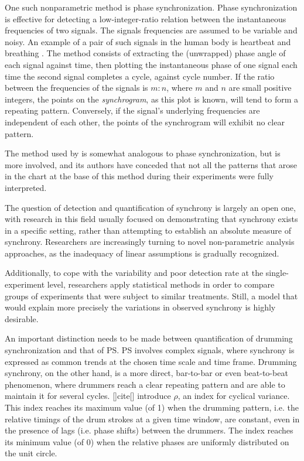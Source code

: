 \documentclass[a4paper, 11pt]{report}      %
\begin{document}
One such nonparametric method is phase synchronization. Phase synchronization is effective for detecting a low-integer-ratio relation between the instantaneous frequencies of two signals. The signals frequencies are assumed to be variable and noisy. An example of a pair of such signals in the human body is heartbeat and breathing \citep{schafer1998heartbeat}. The method consists of extracting the (unwrapped) phase angle of each signal against time, then plotting the instantaneous phase of one signal each time the second signal completes a cycle, against cycle number. If the ratio between the frequencies of the signals is $m:n$, where $m$ and $n$ are small positive integers, the points on the \emph{synchrogram}, as this plot is known, will tend to form a repeating pattern. Conversely, if the signal's underlying frequencies are independent of each other, the points of the synchrogram will exhibit no clear pattern.

The method used by \cite{wallot2016multidimensional} is somewhat analogous to phase synchronization, but is more involved, and its authors have conceded that not all the patterns that arose in the chart at the base of this method during their experiments were fully interpreted.

The question of detection and quantification of synchrony is largely an open one, with research in this field usually focused on demonstrating that synchrony exists in a specific setting, rather than attempting to establish an absolute measure of synchrony. Researchers are increasingly turning to novel non-parametric analysis approaches, as the inadequacy of linear assumptions is gradually recognized. 

Additionally, to cope with the variability and poor detection rate at the single-experiment level, researchers apply statistical methods in order to compare groups of experiments that were subject to similar treatments. Still, a model that would explain more precisely the variations in observed synchrony is highly desirable.   


An important distinction needs to be made between quantification of drumming synchronization and that of PS. PS involves complex signals, where synchrony is expressed as common trends at the chosen time scale and time frame. Drumming synchrony, on the other hand, is a more direct, bar-to-bar or even beat-to-beat phenomenon, where drummers reach a clear repeating pattern and are able to maintain it for several cycles. []cite[] introduce $\rho$, an index for cyclical variance. This index reaches its maximum value (of 1) when the drumming pattern, i.e. the relative timings of the drum strokes at a given time window, are constant, even in the presence of lags (i.e. phase shifts) between the drummers. The index reaches its minimum value (of 0) when the relative phases are uniformly distributed on the unit circle.



\end{document}
